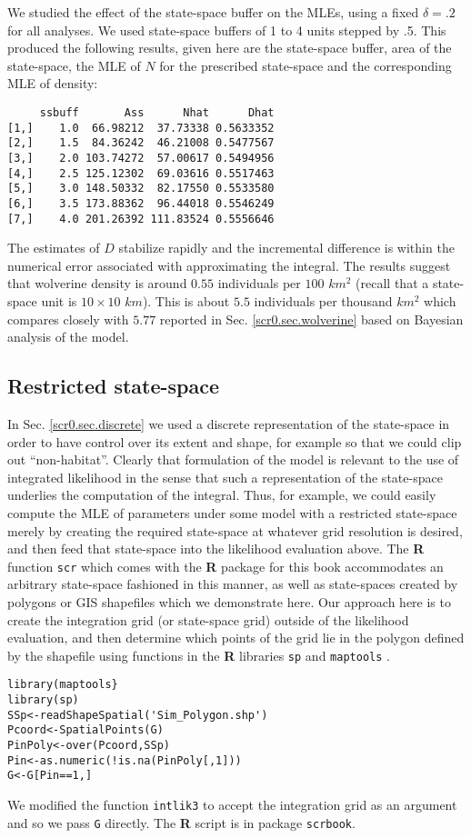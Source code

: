 We studied the effect of the state-space buffer on the MLEs,
using a fixed $\delta = .2$ for all analyses. We used state-space buffers
of 1 to 4 units stepped by .5. This produced the following results,
given here are the state-space buffer, area of the state-space, the
MLE of $N$ for the prescribed state-space and the corresponding MLE of
density:
{\small
\begin{verbatim}
     ssbuff       Ass      Nhat      Dhat
[1,]    1.0  66.98212  37.73338 0.5633352
[2,]    1.5  84.36242  46.21008 0.5477567
[3,]    2.0 103.74272  57.00617 0.5494956
[4,]    2.5 125.12302  69.03616 0.5517463
[5,]    3.0 148.50332  82.17550 0.5533580
[6,]    3.5 173.88362  96.44018 0.5546249
[7,]    4.0 201.26392 111.83524 0.5556646
\end{verbatim}
}
The estimates of $D$ stabilize rapidly and the incremental difference
is within the numerical error associated with approximating the
integral.  The results suggest that wolverine density is around $0.55$
individuals per $100$ $km^2$ (recall that a state-space unit is $10
\times 10$ $km$).  This is about $5.5$ individuals per thousand $km^2$
which compares closely with $5.77$ reported
in Sec. \ref{scr0.sec.wolverine} based on Bayesian analysis of the
model.


\subsection{Restricted state-space}
\label{mle.sec.shapefile}

In Sec. \ref{scr0.sec.discrete} 
 we used a discrete representation of
the state-space in order to have control over its extent and shape,
for example so that we could clip out ``non-habitat''. Clearly that
formulation of the model is relevant to the use of integrated
likelihood in the sense that such a representation of the state-space
underlies the computation of the integral. Thus, for example, we could
easily compute the MLE of parameters under some model with a
restricted state-space merely by creating the required state-space at
whatever grid resolution is desired, and then feed that state-space
into the likelihood evaluation above. The {\bf R} function \mbox{\tt scr}
which comes with the {\bf R} package for this book accommodates an
arbitrary state-space fashioned in this manner, as well as
state-spaces created by polygons or GIS shapefiles  which we
demonstrate here. Our approach here is to create the integration grid
(or state-space grid) outside of the likelihood evaluation, and then
determine which points of the grid lie in the polygon defined by the
shapefile using 
functions in the {\bf R} libraries \mbox{\tt sp}  and
\mbox{\tt maptools}  .
{\small
\begin{verbatim}
library(maptools}
library(sp)
SSp<-readShapeSpatial('Sim_Polygon.shp')
Pcoord<-SpatialPoints(G)
PinPoly<-over(Pcoord,SSp)
Pin<-as.numeric(!is.na(PinPoly[,1]))
G<-G[Pin==1,]
\end{verbatim}
}
We modified the function \mbox{\tt intlik3} to accept the integration
grid as an argument and so we pass \mbox{\tt G} directly. The {\bf R} 
script is in package \mbox{\tt scrbook}.

